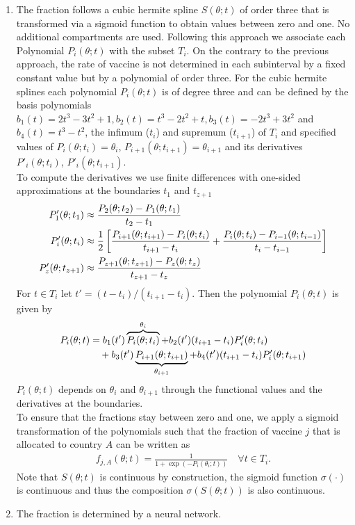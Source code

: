 \begin{enumerate}
\item The fraction follows a cubic hermite spline $S(\theta; t)$ of order three that is transformed via a sigmoid function to obtain values between zero and one. No additional compartments are used. 
Following this approach we associate each Polynomial $P_{i}(\theta; t)$ with the subset $T_i$. On the contrary to the previous approach, the rate of vaccine is not determined in each subinterval by a fixed constant value but by a polynomial of order three. For the cubic hermite splines each polynomial $P_{i}(\theta; t)$ is of degree three and can be defined by the basis polynomials $b_1(t) = 2t^3 - 3t^2 +1, b_2(t) = t^3 - 2t^2 +t, b_3(t) = -2t^3 + 3t^2$ and
$b_4(t) = t^3 - t^2$, the infimum ($t_i$) and supremum ($t_{i+1}$) of $T_i$ and specified values of $P_{i}(\theta; t_i) = \theta_i$, $P_{i+1}(\theta; t_{i+1})=\theta_{i+1}$ and its derivatives $P'_{i}(\theta; t_i)$, $P'_{i}(\theta; t_{i+1})$.\\
To compute the derivatives we use finite differences with one-sided approximations at the boundaries $t_1$ and $t_{z+1}$
\begin{align*}
P'_{1}(\theta; t_1) &\approx \frac{P_{2}(\theta; t_2) - P_{1}(\theta; t_1)}{t_2 - t_1} \notag \\
P'_{i}(\theta; t_i) &\approx \frac{1}{2}\left[\frac{P_{i+1}(\theta; t_{i+1}) - P_{i}(\theta; t_i)}{t_{i+1} - t_i} + \frac{P_{i}(\theta; t_{i}) - P_{i-1}(\theta; t_{i-1})}{t_{i} - t_{i-1}} \right] \notag \\
P'_{z}(\theta; t_{z+1}) &\approx \frac{P_{z+1}(\theta; t_{z+1}) - P_{z}(\theta; t_z)}{t_{z+1} - t_z}
\end{align*}
For $t \in T_i$ let $t' = (t-t_i)/(t_{i+1} - t_i)$. Then the polynomial $P_{i}(\theta; t) $ is given by 
\begin{align*}
P_{i}(\theta; t) &= b_1(t') \overbrace{P_{i}(\theta; t_i)}^{\theta_i} + b_2(t') (t_{i+1} - t_i) P'_{i}(\theta; t_i) \notag \\& \quad + b_3(t') \underbrace{P_{i+1}(\theta; t_{i+1})}_{\theta_{i+1}} + b_4(t') (t_{i+1} - t_i) P'_{i}(\theta; t_{i+1})
\end{align*}
$P_{i}(\theta; t)$ depends on $\theta_i$ and $\theta_{i+1}$ through the functional values and the derivatives at the boundaries.  \\
To ensure that the fractions stay between zero and one, we apply a sigmoid transformation of the polynomials such that the fraction of vaccine $j$ that is allocated to country $A$ can be written as
\begin{align}
f_{j,A}(\theta; t) =  \frac{1}{1 + \exp{(-P_{i}(\theta_i; t))}} \quad \forall t \in T_i. 
\end{align}
Note that $S(\theta; t)$ is continuous by construction, the sigmoid function $\sigma(\cdot)$ is continuous and thus the composition $\sigma(S(\theta; t))$ is also continuous.


\item The fraction is determined by a neural network. 
\end{enumerate}    

